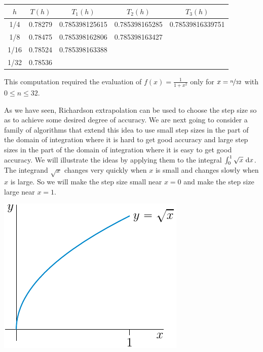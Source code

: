 {\begin{eg}
\begin{center}
     \begin{tabular}{|c|c|c|c|c|}
          \hline
          $h$ & $T(h)$ & $T_1(h)$ & $T_2(h)$ & $T_3(h)$\\ \hline
      1/4 & 0.78279
          & 0.785398125615
          & 0.785398165285
          & 0.78539816339751 \\ \hline
      1/8 & 0.78475
          & 0.785398162806
          & 0.785398163427 \\ \cline{1-4}
     1/16 & 0.78524
          & 0.785398163388 \\ \cline{1-3}
     1/32 & 0.78536 \\ \cline{1-2}
     \end{tabular}
\end{center}
This computation required the evaluation of $f(x)=\frac{1}{1+x^2}$ only
for $x=\nicefrac{n}{32}$ with $0\le n\le 32$.
\end{eg}
}

As we have seen, Richardson extrapolation can be used to choose the 
step size so as to achieve some desired degree of accuracy.
We are next going to consider a family of algorithms that extend this idea
to use small step sizes in the part of the domain of integration where it 
is hard to get good accuracy and large step sizes in the part of the domain 
of integration where it is easy to get good accuracy. We will illustrate 
the ideas by applying them to the integral $\int_0^1 \sqrt{x}\ \mathrm{d}x$.
The integrand $\sqrt{x}$ changes very quickly when $x$ is small and changes slowly when $x$ is large. So we will make the step size small near $x=0$ and make the step size large near $x=1$. 

\begin{efig}
\begin{center}
    \includegraphics{squareRoot.pdf}
\end{center}
\end{efig}

